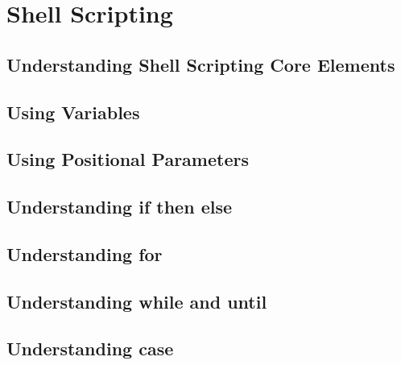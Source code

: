 \chapter{Shell Scripting}

\section{Understanding Shell Scripting Core Elements}
\section{Using Variables}
\section{Using Positional Parameters}
\section{Understanding if then else}
\section{Understanding for}
\section{Understanding while and until}
\section{Understanding case}

